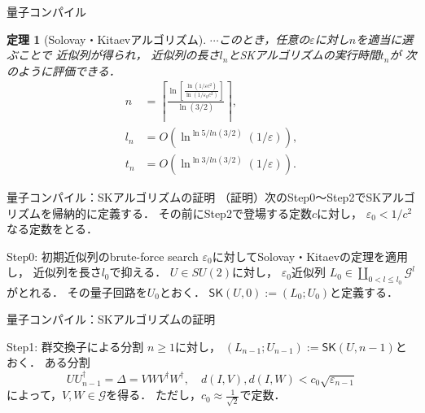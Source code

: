 \documentclass{beamer} %
\renewcommand{\epsilon}{\varepsilon}
\newtheorem{thm}{定理}
\newcommand{\0}{\mathbf{0}}
\newcommand{\1}{\mathbf{1}}
\newcommand{\2}{\mathbf{2}}
\newcommand{\SK}{\mathsf{SK}}
\begin{document}
\begin{frame}{量子コンパイル}
  \begin{thm}[Solovay・Kitaevアルゴリズム]
    \(\cdots\)このとき，任意の\(\epsilon\)に対し\(n\)を適当に選ぶことで
    近似列が得られ，
    近似列の長さ\(l_n\)とSKアルゴリズムの実行時間\(t_n\)が
    次のように評価できる．
    \begin{align*}
      n   & = \left\lceil\frac{\ln[\frac{\ln(1/\epsilon c^2)}{\ln(1/\epsilon_0 c^2)}]}{\ln(3/2)}\right\rceil, \\
      l_n & = O(\ln^{\ln 5/ln(3/2)}(1/\epsilon)),                                                             \\
      t_n & = O(\ln^{\ln 3/ln(3/2)}(1/\epsilon)).
    \end{align*}
  \end{thm}
\end{frame}

\begin{frame}{量子コンパイル：SKアルゴリズムの証明}
  （証明）次のStep0〜Step2でSKアルゴリズムを帰納的に定義する．
  その前にStep2で登場する定数\(c\)に対し，
  \(\epsilon_0 < 1/c^2\)なる定数をとる．
  \begin{exampleblock}
    {Step0: 初期近似列のbrute-force search}
    \(\epsilon_0\)に対してSolovay・Kitaevの定理を適用し，
    近似列を長さ\(l_0\)で抑える．
    \(U\in SU(2)\)に対し，
    \(\epsilon_0\)近似列
    \(L_0 \in \coprod_{0 < l \leq l_0}\mathcal{G}^l\)
    がとれる．
    その量子回路を\(U_0\)とおく．
    \(\SK(U,0) := (L_0;U_0)\)と定義する．
  \end{exampleblock}
\end{frame}

\begin{frame}{量子コンパイル：SKアルゴリズムの証明}
  \begin{exampleblock}{Step1: 群交換子による分割}
    \(n\geq 1\)に対し，
    \((L_{n-1};U_{n-1}) := \SK(U,n-1)\)とおく．
    ある分割
    \begin{equation*}\label{gc decomp}
      UU_{n-1}^\dagger = \Delta = VWV^\dagger W^\dagger,\quad
      d(I,V),d(I,W) < c_0\sqrt{\epsilon_{n-1}}
    \end{equation*}
    によって，\(V,W\in\mathcal{G}\)を得る．
    ただし，\(c_0\approx\frac{1}{\sqrt{2}}\)で定数．
  \end{exampleblock}
\end{frame}
\end{document}

